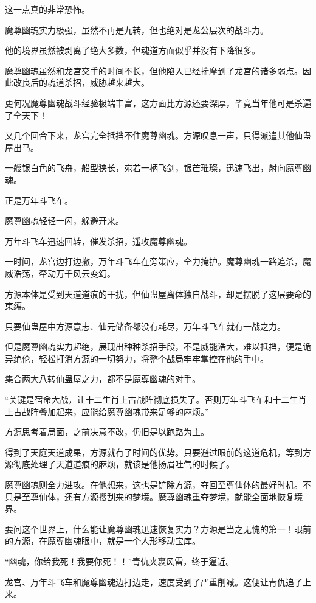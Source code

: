 \begin{this_body}
这一点真的非常恐怖。

魔尊幽魂实力极强，虽然不再是九转，但也绝对是龙公层次的战斗力。

他的境界虽然被剥离了绝大多数，但魂道方面似乎并没有下降很多。

魔尊幽魂虽然和龙宫交手的时间不长，但他陷入已经揣摩到了龙宫的诸多弱点。因此改良后的魂道杀招，威胁越来越大。

更何况魔尊幽魂战斗经验极端丰富，这方面比方源还要深厚，毕竟当年他可是杀遍了全天下！

又几个回合下来，龙宫完全抵挡不住魔尊幽魂。方源叹息一声，只得派遣其他仙蛊屋出马。

一艘银白色的飞舟，船型狭长，宛若一柄飞剑，银芒璀璨，迅速飞出，射向魔尊幽魂。

正是万年斗飞车。

魔尊幽魂轻轻一闪，躲避开来。

万年斗飞车迅速回转，催发杀招，遥攻魔尊幽魂。

一时间，龙宫边打边撤，万年斗飞车在旁策应，全力掩护。魔尊幽魂一路追杀，魔威浩荡，牵动万千风云变幻。

方源本体是受到天道道痕的干扰，但仙蛊屋离体独自战斗，却是摆脱了这层要命的束缚。

只要仙蛊屋中方源意志、仙元储备都没有耗尽，万年斗飞车就有一战之力。

但是魔尊幽魂实力超绝，展现出种种杀招手段，不是威能浩大，难以抵挡，便是诡异绝伦，轻松打消方源的一切努力，将整个战局牢牢掌控在他的手中。

集合两大八转仙蛊屋之力，都不是魔尊幽魂的对手。

“关键是宿命大战，让十二生肖上古战阵彻底损失了。否则万年斗飞车和十二生肖上古战阵叠加起来，应能给魔尊幽魂带来足够的麻烦。”

方源思考着局面，之前决意不改，仍旧是以跑路为主。

得到了天庭天道成果，方源就有了时间的优势。只要避过眼前的这道危机，等到方源彻底处理了天道道痕的麻烦，就该是他扬眉吐气的时候了。

魔尊幽魂则全力进攻。在他想来，这也是铲除方源，夺回至尊仙体的最好时机。不只是至尊仙体，还有方源搜刮来的梦境。魔尊幽魂重夺梦境，就能全面地恢复境界。

要问这个世界上，什么能让魔尊幽魂迅速恢复实力？方源是当之无愧的第一！眼前的方源，在魔尊幽魂眼中，就是一个人形移动宝库。

“幽魂，你给我死！我要你死！！”青仇夹裹风雷，终于逼近。

龙宫、万年斗飞车和魔尊幽魂边打边走，速度受到了严重削减。这便让青仇追了上来。


\end{this_body}
